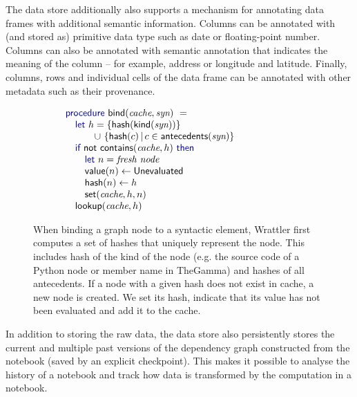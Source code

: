 \documentclass[sigplan]{acmart}\settopmatter{printfolios=true,printccs=false,printacmref=false}
\begin{document}
The data store additionally also supports a mechanism for annotating data frames with additional 
semantic information. Columns can be annotated with (and stored as) primitive data type such as 
date or floating-point number. Columns can also be annotated with semantic annotation that indicates
the meaning of the column -- for example, address or longitude and latitude. Finally, columns,
rows and individual cells of the data frame can be annotated with other metadata such as their
provenance.

\begin{figure}
\vspace{-1em}
\begin{equation*}
\hspace{-6em}\begin{array}{l}
\kvd{procedure}~\ident{bind}(\textit{cache}, \textit{syn})~=\\
\quad \kvd{let}~h = \{ \ident{hash}(\ident{kind}(\textit{syn})) \} \\  
\quad \qquad \cup~ \{\ident{hash}(c) \,|\, c\in\ident{antecedents}(\textit{syn}) \}\\
\quad \kvd{if}~\ident{not}~\ident{contains}(\textit{cache}, h)~\kvd{then}\\
\quad \quad \kvd{let}~n = \emph{fresh node}\\
\quad \quad \ident{value}(n) \leftarrow \ident{Unevaluated} \\
\quad \quad \ident{hash}(n) \leftarrow h\\
\quad \quad \ident{set}(\textit{cache}, h, n) \\
\quad \ident{lookup}(\textit{cache}, h)\\
\end{array}
\end{equation*}
\vspace{-0.5em}
\caption{\small{When binding a graph node to a syntactic element, Wrattler first computes
  a set of hashes that uniquely represent the node. This includes hash of the kind of the 
  node (e.g. the source code of a Python node or member name in TheGamma) and hashes
  of all antecedents. If a node with a given hash does not exist in cache, a new node
  is created. We set its hash, indicate that its value has not been evaluated and
  add it to the cache.}}
\label{fig:bind}
\end{figure}

In addition to storing the raw data, the data store also persistently stores the current and
multiple past versions of the dependency graph constructed from the notebook (saved by an 
explicit checkpoint). This makes it possible to analyse the history of a notebook and track how
data is transformed by the computation in a notebook.
\end{document}
